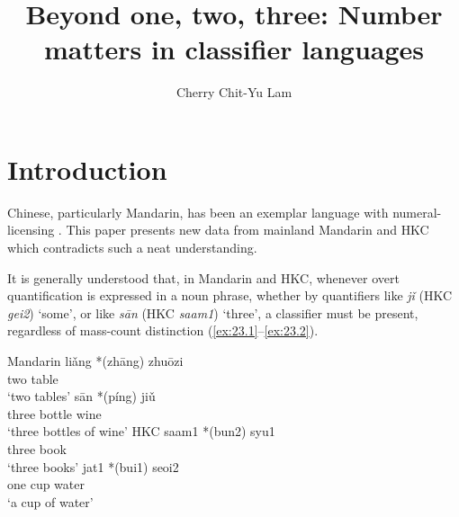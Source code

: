 \documentclass[output=paper]{langsci/langscibook}
\author{Cherry Chit-Yu Lam\affiliation{The Open University of Hong Kong}}
\title{Beyond one, two, three: Number matters in classifier languages}
\begin{document}
\glsresetall

\section{Introduction}

Chinese, particularly Mandarin, has been an exemplar
language with numeral-licensing . This paper presents new data from
mainland Mandarin and \gls{HKC} which contradicts such
a neat understanding.

It is generally understood that, in Mandarin and \gls{HKC}, whenever overt quantification is expressed in a noun phrase,
whether by quantifiers like \emph{jǐ} (\gls{HKC} \emph{gei2}) ‘some’, or
 like \emph{sān} (\gls{HKC} \emph{saam1}) ‘three’, a
classifier must be present, regardless of mass-count
distinction (\ref{ex:23.1}--\ref{ex:23.2}).

\ea\label{ex:23.1}Mandarin \parencites[92]{Chierchia1998}[519]{ChengSybesma1999} %
	\ea
    \gll    liǎng *(zhāng) zhuōzi\\
            two \hphantom{*(}\Clf{} table\\
	\glt    \enquote*{two tables}
	\ex
    \gll    sān *(píng) jiǔ\\
            three \hphantom{*(}bottle  wine\\
    \glt    ‘three bottles of wine’
	\z
\ex \label{ex:23.2}\gls{HKC} \parencites[14]{Sio2006}[272]{ChengSybesma2005}%
	\ea
	\gll saam1 *(bun2) syu1\\
    three \hphantom{*(}\Clf{}  book\\
	\glt ‘three books’
	\ex
	\gll jat1 *(bui1) seoi2\\
    one \hphantom{*(}cup water\\
    \glt ‘a cup of water’
	\z
\z
\end{document}
